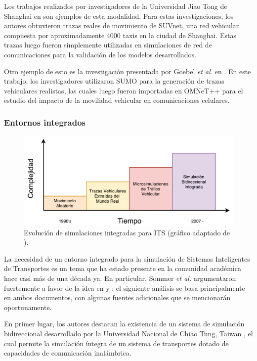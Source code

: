 Los trabajos realizados por investigadores de la Universidad Jiao Tong de Shanghai en \autocite{suvnet1,suvnet2} son ejemplos de esta modalidad. Para estas investigaciones, los autores obtuvieron trazas reales de movimiento de SUVnet, una red vehicular compuesta por aproximadamente 4000 taxis en la ciudad de Shanghai. Estas trazas luego fueron simplemente utilizadas en simulaciones de red de comunicaciones para la validación de los modelos desarrollados.

Otro ejemplo de esto es la investigación presentada por Goebel \emph{et al.} en \autocite{omnetv2xtraces}. En este trabajo, los investigadores utilizaron SUMO para la generación de trazas vehiculares realistas, las cuales luego fueron importadas en OMNeT++ para el estudio del impacto de la movilidad vehicular en comunicaciones celulares. 
\newpage
\subsubsection{Entornos integrados}\label{sec:integrated_sim}

\begin{figure}
    \centering
    \includegraphics[width=\linewidth]{figuras/sommer_adapted.pdf}
    \caption[Evolución de simulaciones integradas.]{Evolución de simulaciones integradas para ITS (gráfico adaptado de \autocite{sommer_dressler2}).}
    \label{fig:bidir_evol}
\end{figure}

La necesidad de un entorno integrado para la simulación de Sistemas Inteligentes de Transportes es un tema que ha estado presente en la comunidad académica hace casi más de una década ya. En particular, Sommer \emph{et al.} argumentaron fuertemente a favor de la idea en \autocite{sommer2008need} y \autocite{sommer_dressler2}; el siguiente análisis se basa principalmente en ambos documentos, con algunas fuentes adicionales que se mencionarán oportunamente. 

En primer lugar, los autores destacan la existencia de un sistema de simulación bidireccional desarrollado por la Universidad Nacional de Chiao Tung, Taiwan \autocite{nctuns4,nctuns6}, el cual permite la simulación íntegra de un sistema de transportes dotado de capacidades de comunicación inalámbrica. 

